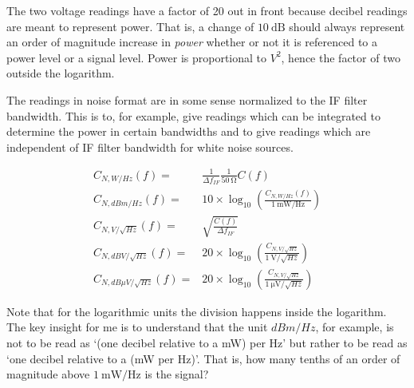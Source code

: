 \documentclass[12pt]{article}
\begin{document}
The two voltage readings have a factor of 20 out in front because decibel readings are meant to represent power.
That is, a change of $\SI{10}{\dB}$ should always represent an order of magnitude increase in \textit{power} whether or not it is referenced to a power level or a signal level.
Power is proportional to $V^2$, hence the factor of two outside the logarithm.

The readings in noise format are in some sense normalized to the IF filter bandwidth.
This is to, for example, give readings which can be integrated to determine the power in certain bandwidths and to give readings which are independent of IF filter bandwidth for white noise sources.

\begin{align}
C_{N, W/Hz}(f) =& \frac{1}{\Delta f_{IF}}\frac{1}{\SI{50}{\ohm}} C(f)\\
C_{N, dBm/Hz}(f) =& 10 \times \log_{10}\left(\frac{C_{N, W/Hz}(f)}{\SI{1}{\mW / \Hz}}\right)\\
C_{N, V/\sqrt{Hz}}(f) =& \sqrt{\frac{C(f)}{\Delta f_{IF}}}\\
C_{N, dBV/\sqrt{Hz}}(f) =& 20 \times \log_{10}\left(\frac{C_{N, V/\sqrt{Hz}}}{\SI{1}{\volt /\sqrt{Hz}}} \right)\\
C_{N, dB\mu V/\sqrt{Hz}}(f) =& 20 \times \log_{10}\left(\frac{C_{N, V/\sqrt{Hz}}}{\SI{1}{\micro \volt /\sqrt{Hz}}} \right)
\end{align}

Note that for the logarithmic units the division happens inside the logarithm.
The key insight for me is to understand that the unit $dBm  / Hz$, for example, is not to be read as `(one decibel relative to a mW) per Hz' but rather to be read as `one decibel relative to a (mW per Hz)'.
That is, how many tenths of an order of magnitude above $\SI{1}{\mW / \Hz}$ is the signal?
\end{document}
